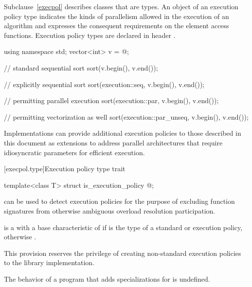 \pnum
Subclause~\ref{execpol} describes classes that are  types. An
object of an execution policy type indicates the kinds of parallelism allowed
in the execution of an algorithm and expresses the consequent requirements on
the element access functions.
Execution policy types are declared in header .
\begin{example}
\begin{codeblock}
using namespace std;
vector<int> v = @\commentellip@;

// standard sequential sort
sort(v.begin(), v.end());

// explicitly sequential sort
sort(execution::seq, v.begin(), v.end());

// permitting parallel execution
sort(execution::par, v.begin(), v.end());

// permitting vectorization as well
sort(execution::par_unseq, v.begin(), v.end());
\end{codeblock}
\end{example}
\begin{note}
Implementations can provide additional execution policies
to those described in this document as extensions
to address parallel architectures that require idiosyncratic
parameters for efficient execution.
\end{note}

[execpol.type]{Execution policy type trait}

%
\begin{itemdecl}
template<class T> struct is_execution_policy { @\seebelow@ };
\end{itemdecl}

\begin{itemdescr}
\pnum
{} can be used to detect execution policies for the
purpose of excluding function signatures from otherwise ambiguous overload
resolution participation.

\pnum
{} is a  with a
base characteristic of  if  is the type of a standard
or 
execution policy, otherwise .

\begin{note}
This provision reserves the privilege of creating non-standard execution
policies to the library implementation.
\end{note}

\pnum
The behavior of a program that adds specializations for
 is undefined.
\end{itemdescr}

